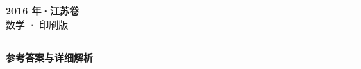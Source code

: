 \documentclass[zihao=5, a4paper]{ctexart}
\begin{document}
\begin{center}
  {\Large\bfseries 2016 年·江苏卷}\\[4pt]
  {\large 数学 · 印刷版}
\end{center}
\medskip
{}

\par\bigskip\hrule\bigskip
{}
\begin{center}{\large\bfseries 参考答案与详细解析}\end{center}
\smallskip

\end{document}
